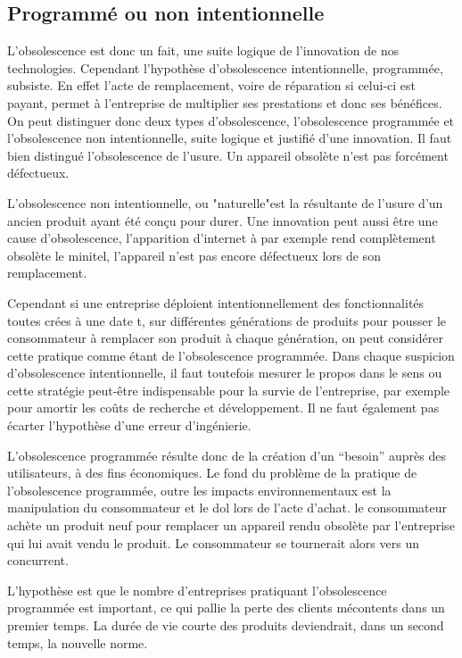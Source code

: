 \subsection{Programmé ou non intentionnelle}

L'obsolescence est donc un fait, une suite logique de l'innovation de nos technologies. Cependant l'hypothèse d'obsolescence intentionnelle, programmée, subsiste. En effet l'acte de remplacement, voire de réparation si celui-ci est payant, permet à l'entreprise de multiplier ses prestations et donc ses bénéfices. On peut distinguer donc deux types d'obsolescence, l'obsolescence programmée et l'obsolescence non intentionnelle, suite logique et justifié d’une innovation. Il faut bien distingué l’obsolescence de l’usure. Un appareil obsolète n’est pas forcément défectueux.

L'obsolescence non intentionnelle, ou "naturelle"est la résultante de l'usure d'un ancien produit ayant été conçu pour durer.  Une innovation peut aussi être une cause d'obsolescence, l’apparition d’internet à par exemple rend complètement obsolète le minitel, l’appareil n’est pas encore défectueux lors de son remplacement.

Cependant si une entreprise déploient intentionnellement des fonctionnalités toutes crées à une date t, sur différentes générations de produits pour pousser le consommateur à remplacer son produit à chaque génération, on peut considérer cette pratique comme étant de l'obsolescence programmée. Dans chaque suspicion d’obsolescence intentionnelle, il faut toutefois mesurer le propos dans le sens ou cette stratégie peut-être indispensable pour la survie de l’entreprise, par exemple pour amortir les coûts de recherche et développement. Il ne faut également pas écarter l’hypothèse d’une erreur d'ingénierie.

L'obsolescence programmée résulte donc de la création d'un “besoin” auprès des utilisateurs, à des fins économiques. Le fond du problème de la pratique de l'obsolescence programmée, outre les impacts environnementaux est la manipulation du consommateur et le dol lors de l'acte d'achat. le consommateur achète un produit neuf pour remplacer un appareil rendu obsolète par l'entreprise qui lui avait vendu le produit. Le consommateur se tournerait alors vers un concurrent.

L’hypothèse est que le nombre d’entreprises pratiquant l’obsolescence programmée est important, ce qui pallie la perte des clients mécontents dans un premier temps. La durée de vie courte des produits deviendrait, dans un second temps, la nouvelle norme.
